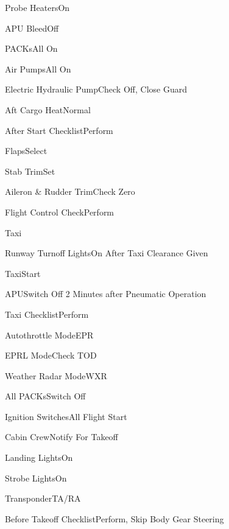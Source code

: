 \documentclass[sim-use, blue_items]{checklist}
\begin{document}
\begin{continuedchecklist}
	\item{Probe Heaters}{On}
	\item{APU Bleed}{Off}
	\item{PACKs}{All On}
	\item{Air Pumps}{All On}
	\item{Electric Hydraulic Pump}{Check Off, Close Guard}
	\item{Aft Cargo Heat}{Normal}
	\item{After Start Checklist}{Perform}
	\item{Flaps}{Select}
	\item{Stab Trim}{Set}
	\item{Aileron \& Rudder Trim}{Check Zero}
	\item{Flight Control Check}{Perform}
\end{continuedchecklist}

\begin{checklist}{Taxi}
	\item{Runway Turnoff Lights}{On After Taxi Clearance Given}
	\item{Taxi}{Start}
	\item{APU}{Switch Off 2 Minutes after Pneumatic Operation}
	\item{Taxi Checklist}{Perform}
	 {
		\item{Autothrottle Mode}{EPR}
		\item{EPRL Mode}{Check TOD}
		\item{Weather Radar Mode}{WXR}
	}
	 {
		\item{All PACKs}{Switch Off}
		\item{Ignition Switches}{All Flight Start}
		\item{Cabin Crew}{Notify For Takeoff}
		\item{Landing Lights}{On}
		\item{Strobe Lights}{On}
		\item{Transponder}{TA/RA}
		\item{Before Takeoff Checklist}{Perform, Skip Body Gear Steering}
	}
\end{checklist}
\end{document}
